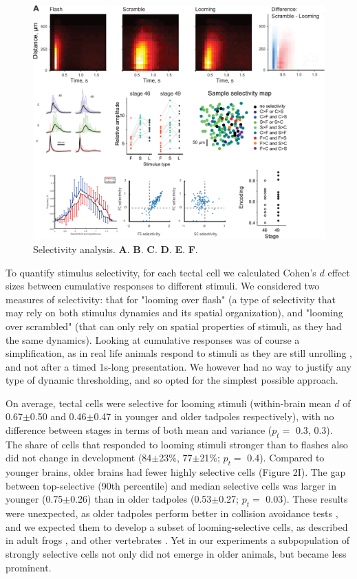 \documentclass{article}
\begin{document}
\begin{figure}[t!]
\includegraphics[width=\linewidth]{fig2.pdf}
\caption{
Selectivity analysis. \textbf{A}. \textbf{B}. \textbf{C}. \textbf{D}. \textbf{E}. \textbf{F}. }
\end{figure}

To quantify stimulus selectivity, for each tectal cell we calculated Cohen’s $d$ effect sizes between cumulative responses to different stimuli. We considered two measures of selectivity: that for "looming over flash" (a type of selectivity that may rely on both stimulus dynamics and its spatial organization), and "looming over scrambled" (that can only rely on spatial properties of stimuli, as they had the same dynamics). Looking at cumulative responses was of course a simplification, as in real life animals respond to stimuli as they are still unrolling \citep{peron2009adaptation,khakhalin2014}, and not after a timed 1s-long presentation. We however had no way to justify any type of dynamic thresholding, and so opted for the simplest possible approach.

On average, tectal cells were selective for looming stimuli (within-brain mean $d$ of 0.67$\pm$0.50 and 0.46$\pm$0.47 in younger and older tadpoles respectively), with no difference between stages in terms of both mean and variance ($p_t=$ 0.3, 0.3). The share of cells that responded to looming stimuli stronger than to flashes also did not change in development (84$\pm$23\%, 77$\pm$21\%; $p_t=$ 0.4). Compared to younger brains, older brains had fewer highly selective cells (Figure 2I). The gap between top-selective (90th percentile) and median selective cells was larger in younger (0.75$\pm$0.26) than in older tadpoles (0.53$\pm$0.27; $p_t=$ 0.03). These results were unexpected, as older tadpoles perform better in collision avoidance tests \citep{dong2009}, and we expected them to develop a subset of looming-selective cells, as described in adult frogs \citep{nakagawa2010otneurons,baranauskas2012}, and other vertebrates \citep{wang1992pigeon,wu2005pigeon,liu2011cat}. Yet in our experiments a subpopulation of strongly selective cells not only did not emerge in older animals, but became less prominent.
\end{document}
